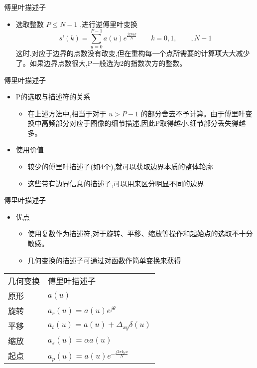 \documentclass[presentation]{beamer}
\begin{document}
\begin{frame}[label={sec:orgf83d442}]{傅里叶描述子}
\begin{itemize}
\item 选取整数 \(P\leq N-1\) ,进行逆傅里叶变换
\[ s’(k) = \sum_{u=0}^{P-1}a(u)e^{\frac{j2\pi uk}{N}}\qquad k=0,1,\qquad,N-1\]
 这时,对应于边界的点数没有改变,但在重构每一个点所需要的计算项大大减少了。如果边界点数很大,P一般选为2的指数次方的整数。
\end{itemize}
\end{frame}
\begin{frame}[label={sec:orgb653c07}]{傅里叶描述子}
\begin{itemize}
\item P的选取与描述符的关系
\begin{itemize}
\item 在上述方法中,相当于对于 \(u>P-1\) 的部分舍去不予计算。由于傅里叶变换中高频部分对应于图像的细节描述,因此P取得越小,细节部分丢失得越多。
\end{itemize}
\item 使用价值
\begin{itemize}
\item 较少的傅里叶描述子(如4个),就可以获取边界本质的整体轮廓
\item 这些带有边界信息的描述子,可以用来区分明显不同的边界
\end{itemize}
\end{itemize}
\end{frame}

\begin{frame}[label={sec:orgf84465f}]{傅里叶描述子}
\begin{itemize}
\item 优点
\begin{itemize}
\item 使用复数作为描述符,对于旋转、平移、缩放等操作和起始点的选取不十分敏感。
\item 几何变换的描述子可通过对函数作简单变换来获得
\end{itemize}
\end{itemize}
\begin{center}
\begin{tabular}{ll}
几何变换 & 傅里叶描述子\\[0pt]
原形 & \(a(u)\)\\[0pt]
旋转 & \(a_r(u) = a(u) e^{j\theta}\)\\[0pt]
平移 & \(a_t(u) = a(u) + \Delta_{xy}\delta(u)\)\\[0pt]
缩放 & \(a_s(u) = \alpha a(u)\)\\[0pt]
起点 & \(a_p(u) = a(u) e^{-\frac{j2\pi k_0u}{N}}\)\\[0pt]
\end{tabular}
\end{center}
\end{frame}
\end{document}
